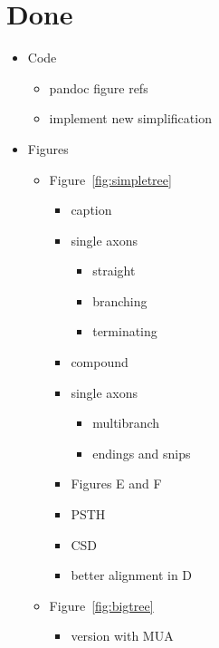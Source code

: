 \documentclass[]{article}
\providecommand{\tightlist}{%
  \setlength{\itemsep}{0pt}\setlength{\parskip}{0pt}}
\begin{document}
\section{Done}\label{done}

\begin{itemize}
\tightlist
\item
  Code

  \begin{itemize}
  \tightlist
  \item
    pandoc figure refs
  \item
    implement new simplification
  \end{itemize}
\item
  Figures

  \begin{itemize}
  \tightlist
  \item
    Figure~\ref{fig:simpletree}

    \begin{itemize}
    \tightlist
    \item
      caption
    \item
      single axons

      \begin{itemize}
      \tightlist
      \item
        straight
      \item
        branching
      \item
        terminating
      \end{itemize}
    \item
      compound
    \item
      single axons

      \begin{itemize}
      \tightlist
      \item
        multibranch
      \item
        endings and snips
      \end{itemize}
    \item
      Figures E and F
    \item
      PSTH
    \item
      CSD
    \item
      better alignment in D
    \end{itemize}
  \item
    Figure~\ref{fig:bigtree}

    \begin{itemize}
    \tightlist
    \item
      version with MUA
    \end{itemize}
  \end{itemize}
\end{itemize}
\end{document}
